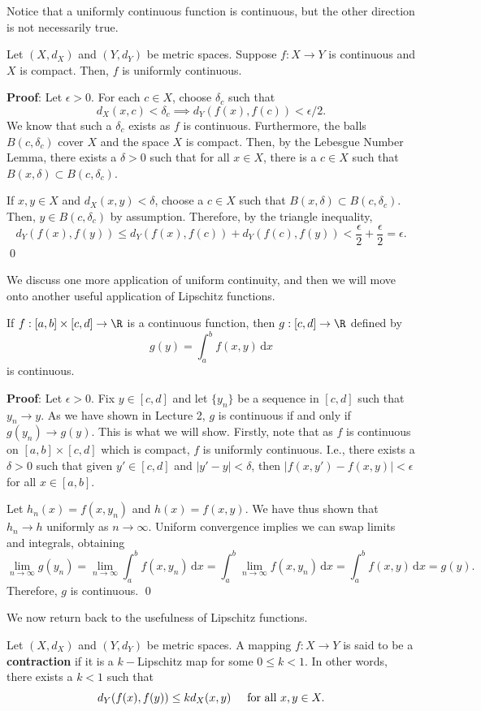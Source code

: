 Notice that a uniformly continuous function is continuous, but the other direction is not necessarily true.

\begin{theorem}
Let $(X,d_X)$ and $(Y,d_Y)$ be metric spaces. Suppose $f:X\to Y$ is continuous and $X$ is compact. Then, $f$ is uniformly continuous.
\end{theorem}
\textbf{Proof}: Let $\epsilon>0$. For each $c\in X$, choose $\delta_c$ such that 
\[
d_X(x,c) < \delta_c \implies d_Y(f(x),f(c)) < \epsilon/2.
\]
We know that such a $\delta_c$ exists as $f$ is continuous. Furthermore, the balls $B(c, \delta_c)$ cover $X$ and the space $X$ is compact. Then, by the Lebesgue Number Lemma, there exists a $\delta>0$ such that for all $x\in X$, there is a $c\in X$ such that $B(x,\delta) \subset B(c,\delta_c)$. 

If $x,y\in X$ and $d_X(x,y) < \delta$, choose a $c\in X$ such that $B(x,\delta) \subset B(c,\delta_c)$. Then, $y\in B(c,\delta_c)$ by assumption. Therefore, by the triangle inequality, 
\[
d_Y(f(x),f(y)) \leq d_Y(f(x), f(c)) + d_Y(f(c), f(y)) < \frac{\epsilon}{2} + \frac{\epsilon}{2} = \epsilon.
\]
\qed 

We discuss one more application of uniform continuity, and then we will move onto another useful application of Lipschitz functions. 
\begin{proposition}\label{prop55}
If $f:[a,b]\times [c,d]\to \R$ is a continuous function, then $g:[c,d] \to \R$ defined by 
\[
g(y) = \int_a^b f(x,y) \,\mathrm dx
\]
is continuous.
\end{proposition}
\textbf{Proof}: Let $\epsilon >0$. Fix $y\in [c,d]$ and let $\{y_n\}$ be a sequence in $[c,d]$ such that $y_n\to y$. As we have shown in Lecture 2, $g$ is continuous if and only if $g(y_n) \to g(y)$. This is what we will show. Firstly, note that as $f$ is continuous on $[a,b]\times [c,d]$ which is compact, $f$ is uniformly continuous. I.e., there exists a $\delta >0$ such that given $y'\in [c,d]$ and $|y'-y| < \delta$, then $|f(x,y') - f(x,y)|< \epsilon$ for all $x\in [a,b]$.

Let $h_n(x) = f(x,y_n)$ and $h(x) = f(x,y)$. We have thus shown that $h_n \to h$ uniformly as $n\to \infty$. Uniform convergence implies we can swap limits and integrals, obtaining
\[
\lim_{n\to \infty}g(y_n) = \lim_{n\to \infty}\int_a^b f(x,y_n)\,\mathrm dx = \int_a^b \lim_{n\to \infty} f(x,y_n)\,\mathrm dx = \int_a^b f(x,y)\,\mathrm dx = g(y).
\]
Therefore, $g$ is continuous. \qed 

We now return back to the usefulness of Lipschitz functions.
\begin{definition}[Contraction]
Let $(X,d_X)$ and $(Y,d_Y)$ be metric spaces. A mapping $f: X\to Y$ is said to be a \textbf{contraction} if it is a $k-$Lipschitz map for some $0 \leq k< 1$. In other words, there exists a $k< 1$ such that 
\[
d_Y(f(x),f(y)) \leq k d_X(x,y) \hspace{.5cm} \text{for all }x,y\in X.
\]
\end{definition}

